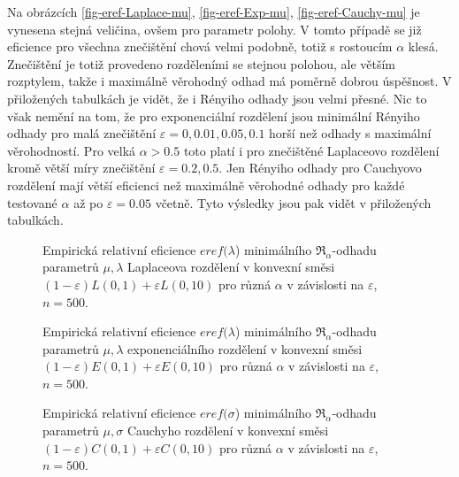 Na obrázcích \ref{fig-eref-Laplace-mu}, \ref{fig-eref-Exp-mu}, \ref{fig-eref-Cauchy-mu} je vynesena stejná veličina, ovšem pro parametr polohy. V tomto případě se již eficience pro všechna znečištění chová velmi podobně, totiž s rostoucím $\alpha$ klesá. Znečištění je totiž provedeno rozděleními se stejnou polohou, ale větším rozptylem, takže i maximálně věrohodný odhad má poměrně dobrou úspěšnost. V přiložených tabulkách je vidět, že i Rényiho odhady jsou velmi přesné. Nic to však nemění na tom, že pro exponenciální rozdělení jsou minimální Rényiho odhady pro malá znečištění $\varepsilon = 0, 0.01, 0.05, 0.1$ horší než odhady s maximální věrohodností. Pro velká $\alpha > 0.5$ toto platí i pro znečištěné Laplaceovo rozdělení kromě větší míry znečištění $\varepsilon = 0.2, 0.5$. Jen Rényiho odhady pro Cauchyovo rozdělení mají větší eficienci než maximálně věrohodné odhady pro každé testované $\alpha$ až po $\varepsilon = 0.05$ včetně. Tyto výsledky jsou pak vidět v přiložených tabulkách.

\begin{figure}[htb!]
	\begin{center}
		\caption{ Empirická relativní eficience $eref({\lambda}$) minimálního $\mathfrak{R}_\alpha$-odhadu parametrů  $\mu,\lambda$ Laplaceova rozdělení v konvexní směsi	$(1-\varepsilon)L(0,1) + \varepsilon L(0,10)$ pro různá $\alpha$ v závislosti na $\varepsilon$, $n=500$. }
		\label{fig-erefe-Lap-lambda}
	\end{center}
\end{figure}

\begin{figure}[htb!]
	\begin{center}
		\caption{ Empirická relativní eficience $eref({\lambda}$) minimálního $\mathfrak{R}_\alpha$-odhadu parametrů  $\mu,\lambda$ exponenciálního rozdělení v konvexní směsi	$(1-\varepsilon)E(0,1) + \varepsilon E(0,10)$ pro různá $\alpha$ v závislosti na $\varepsilon$, $n=500$. }
		\label{fig-erefe-Exp-lambda}
	\end{center}
\end{figure}

\begin{figure}[htb!]
	\begin{center}
		\caption{ Empirická relativní eficience $eref({\sigma}$) minimálního $\mathfrak{R}_\alpha$-odhadu parametrů  $\mu,\sigma$ Cauchyho rozdělení v konvexní směsi	$(1-\varepsilon)C(0,1) + \varepsilon C(0,10)$ pro různá $\alpha$ v závislosti na $\varepsilon$, $n=500$. }
		\label{fig-erefe-Cauchy-sigma}
	\end{center}
\end{figure}

